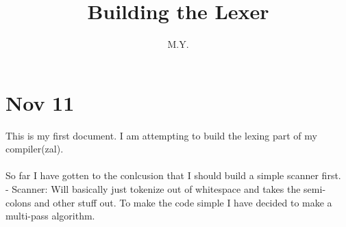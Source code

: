 \documentclass{article}
\begin{document}
\title{Building the Lexer}
\author{M.Y.}

\maketitle

\section*{Nov 11}

This is my first document. I am attempting to build  the
lexing part of my compiler(zal).
\\\\
So far I have gotten to the conlcusion that I should
build a simple scanner first.
\\
- Scanner: Will basically just tokenize out of whitespace
    and takes the semi-colons and other stuff out. To make the
    code simple I have decided to make a multi-pass algorithm.
\end{document}
